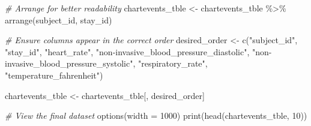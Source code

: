 \documentclass[
]{article}
\newenvironment{Shaded}{\begin{snugshade}}{\end{snugshade}}
\newcommand{\AttributeTok}[1]{\textcolor[rgb]{0.77,0.63,0.00}{#1}}
\newcommand{\CommentTok}[1]{\textcolor[rgb]{0.56,0.35,0.01}{\textit{#1}}}
\newcommand{\DecValTok}[1]{\textcolor[rgb]{0.00,0.00,0.81}{#1}}
\newcommand{\FunctionTok}[1]{\textcolor[rgb]{0.00,0.00,0.00}{#1}}
\newcommand{\NormalTok}[1]{\textcolor[rgb]{0.00,0.00,0.00}{#1}}
\newcommand{\OtherTok}[1]{\textcolor[rgb]{0.56,0.35,0.01}{#1}}
\newcommand{\SpecialCharTok}[1]{\textcolor[rgb]{0.00,0.00,0.00}{#1}}
\newcommand{\StringTok}[1]{\textcolor[rgb]{0.31,0.60,0.02}{#1}}
\begin{document}
\begin{Shaded}
\begin{Highlighting}[]
\CommentTok{\# Arrange for better readability}
\NormalTok{chartevents\_tble }\OtherTok{\textless{}{-}}\NormalTok{ chartevents\_tble }\SpecialCharTok{\%\textgreater{}\%} \FunctionTok{arrange}\NormalTok{(subject\_id, stay\_id)}

\CommentTok{\# Ensure columns appear in the correct order}
\NormalTok{desired\_order }\OtherTok{\textless{}{-}} \FunctionTok{c}\NormalTok{(}\StringTok{"subject\_id"}\NormalTok{, }\StringTok{"stay\_id"}\NormalTok{, }
                   \StringTok{"heart\_rate"}\NormalTok{, }
                   \StringTok{"non{-}invasive\_blood\_pressure\_diastolic"}\NormalTok{, }
                   \StringTok{"non{-}invasive\_blood\_pressure\_systolic"}\NormalTok{,}
                   \StringTok{"respiratory\_rate"}\NormalTok{,}
                   \StringTok{"temperature\_fahrenheit"}\NormalTok{)}

\NormalTok{chartevents\_tble }\OtherTok{\textless{}{-}}\NormalTok{ chartevents\_tble[, desired\_order]}

\CommentTok{\# View the final dataset}
\FunctionTok{options}\NormalTok{(}\AttributeTok{width =} \DecValTok{1000}\NormalTok{)}
\FunctionTok{print}\NormalTok{(}\FunctionTok{head}\NormalTok{(chartevents\_tble, }\DecValTok{10}\NormalTok{))}
\end{Highlighting}
\end{Shaded}
\end{document}
